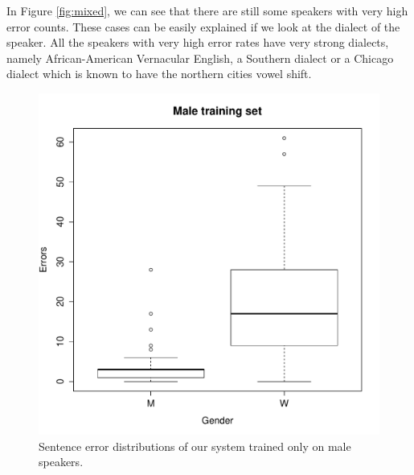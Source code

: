 \documentclass[twocolumn, 11pt]{article}
\begin{document}
In Figure \ref{fig:mixed}, we can see that there are still some speakers with very high error counts.
These cases can be easily explained if we look at the dialect of the speaker. All the speakers with
very high error rates have very strong dialects, namely African-American Vernacular English, a Southern
dialect or a Chicago dialect which is known to have the northern cities vowel shift.

\begin{figure}
\includegraphics[width=\columnwidth]{male_only.pdf}
\caption{\label{fig:male} Sentence error distributions of our system trained only on male speakers.}
\end{figure}
\end{document}

